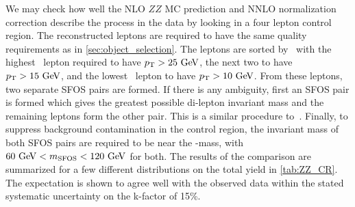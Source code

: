 We may check how well the NLO $ZZ$ MC prediction and 
NNLO normalization correction describe the process in the data by looking
in a four lepton control region. The reconstructed leptons are required to have
the same quality requirements as in \sec\ref{sec:object_selection}.
The leptons are sorted by \pt~with the highest \pt~lepton
required to have $\pt>25\GeV$, the next two to have
$\pt>15\GeV$, and the lowest \pt~lepton to have $\pt>10\GeV$.
From these leptons, two separate SFOS pairs are formed. If there
is any ambiguity, first an SFOS pair is formed which gives the greatest
possible di-lepton invariant mass and the remaining leptons form the other pair.
This is a similar procedure to~\cite{Aad:2014wra}. Finally, 
to suppress background contamination in the control region,
the invariant mass of both SFOS pairs are required to be near the \z-mass, 
with $60\GeV<m_{\textrm{SFOS}}<120\GeV$ for both.
The results of the comparison are summarized for a few different distributions
on the total yield in \tab\ref{tab:ZZ_CR}.
The expectation is shown to agree well with the observed data within the 
stated systematic uncertainty on the k-factor of 15\%. 





